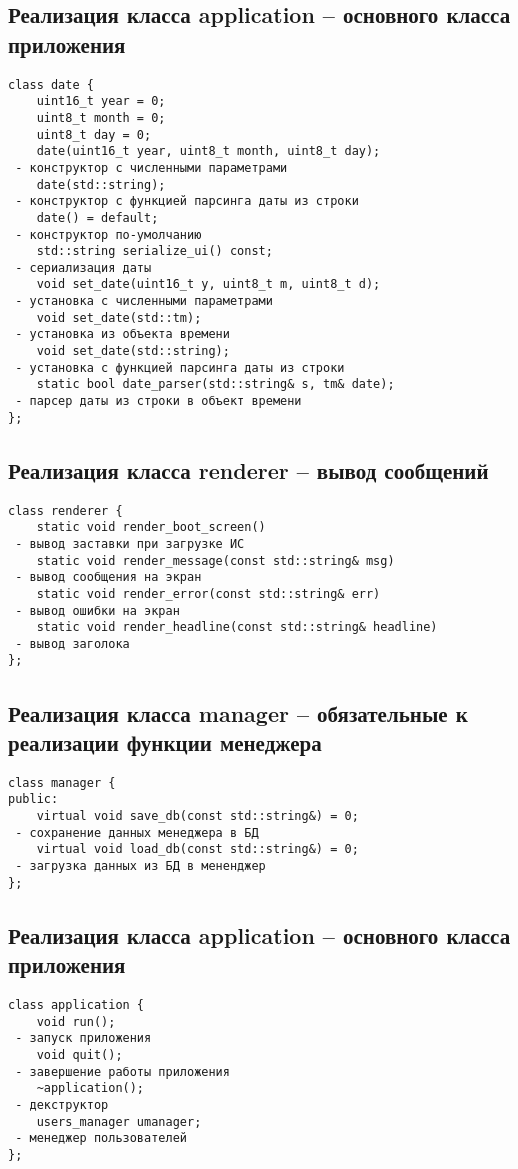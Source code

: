 \subsection{Реализация класса application -- основного класса приложения}
\begin{verbatim}
class date {
	uint16_t year = 0;
	uint8_t month = 0;
	uint8_t day = 0;
	date(uint16_t year, uint8_t month, uint8_t day);
 - конструктор с численными параметрами
	date(std::string);
 - конструктор с функцией парсинга даты из строки
	date() = default;
 - конструктор по-умолчанию
	std::string serialize_ui() const;
 - сериализация даты
	void set_date(uint16_t y, uint8_t m, uint8_t d);
 - установка с численными параметрами
	void set_date(std::tm);
 - установка из объекта времени
	void set_date(std::string);
 - установка с функцией парсинга даты из строки
	static bool date_parser(std::string& s, tm& date);
 - парсер даты из строки в объект времени
};
\end{verbatim}

\subsection{Реализация класса renderer -- вывод сообщений}
\begin{verbatim}
class renderer {
	static void render_boot_screen()
 - вывод заставки при загрузке ИС
	static void render_message(const std::string& msg)
 - вывод сообщения на экран
	static void render_error(const std::string& err)
 - вывод ошибки на экран
	static void render_headline(const std::string& headline)
 - вывод заголока
};
\end{verbatim}

\subsection{Реализация класса manager -- обязательные к реализации функции менеджера}
\begin{verbatim}
class manager {
public:
	virtual void save_db(const std::string&) = 0;
 - сохранение данных менеджера в БД
	virtual void load_db(const std::string&) = 0;
 - загрузка данных из БД в мененджер
};
\end{verbatim}

\subsection{Реализация класса application -- основного класса приложения}
\begin{verbatim}
class application {
	void run();
 - запуск приложения
	void quit();
 - завершение работы приложения
	~application();
 - декструктор
	users_manager umanager;
 - менеджер пользователей
};
\end{verbatim}